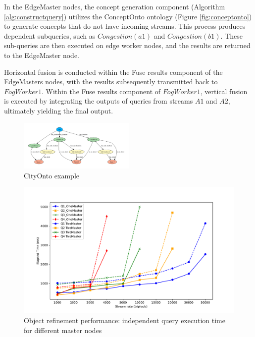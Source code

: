 \documentclass[5p,times]{elsarticle}
\begin{document}
In the EdgeMaster nodes, the concept generation component (Algorithm \ref{alg:constructquery}) utilizes
 the ConceptOnto ontology (Figure \ref{fig:conceptonto}) to generate concepts that do not have incoming streams.
  This process produces dependent subqueries, such as $Congestion(a1)$ and $Congestion(b1)$.
These sub-queries are then executed on edge worker nodes, and the results are returned to the EdgeMaster node. 


Horizontal fusion is conducted within the Fuse results component of the EdgeMasters nodes,
 with the results subsequently transmitted back to $FogWorker1$.
  Within the Fuse results component of $FogWorker1$, vertical fusion is executed by integrating the outputs of queries from streams $A1$ and $A2$, 
  ultimately yielding the final output.



\begin{figure}[t]
  \centering
  \includegraphics[width=0.5\textwidth]{cityOnto_graph.pdf}
  \caption{CityOnto example}
  \label{fig:CityOnto}
\end{figure}

\begin{figure}[t]
  \centering
  \includegraphics[width=\columnwidth]{result_TwoMaster_OneMaster.pdf}
  \caption{Object refinement performance: independent query execution time for different master nodes}
  \label{fig:resultTwoMasterOneMaster}
\end{figure}
\end{document}
